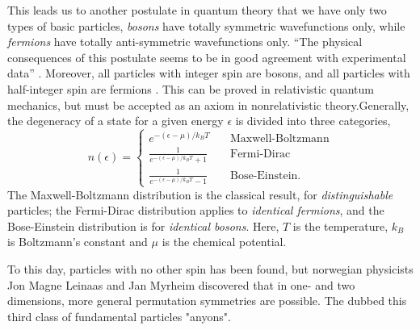         This leads us to another postulate in quantum theory that we have only two types of 
        basic particles, \emph{bosons} have totally symmetric wavefunctions only, while 
        \emph{fermions} have totally anti-symmetric wavefunctions only. ``The physical 
        consequences of this postulate seems to be in good agreement with experimental data''
        \cite{leinaas1977theory}. Moreover, all particles with integer spin are bosons, 
        and all particles with half-integer spin are fermions
        \cite{fierz1939relativistische,pauli1940connection}. This can be proved in relativistic
        quantum mechanics, but must be accepted as an axiom in nonrelativistic 
        theory\cite{hilborn1995atoms}.Generally, the degeneracy of a state for a given 
        energy $\epsilon$ is divided into three categories,
        \begin{equation}
            n(\epsilon) = \begin{cases}
                e^{-(\epsilon - \mu)/k_BT} &\quad \text{Maxwell-Boltzmann} \\
                \frac{1}{e^{-(\epsilon - \mu)/k_BT} + 1} &\quad \text{Fermi-Dirac} \\
                \frac{1}{e^{-(\epsilon - \mu)/k_BT} - 1} &\quad \text{Bose-Einstein}.
            \end{cases}
        \end{equation}
        The Maxwell-Boltzmann distribution is the classical result, for \emph{distinguishable}
        particles; the Fermi-Dirac distribution applies to \emph{identical fermions}, and 
        the Bose-Einstein distribution is for \emph{identical bosons}. Here, $T$ is the 
        temperature, $k_B$ is Boltzmann's constant and $\mu$ is the chemical potential.

        To this day, particles with no other spin has been found, but norwegian physicists
        Jon Magne Leinaas and Jan Myrheim discovered that in one- and two dimensions, more 
        general permutation symmetries are possible. The dubbed this third class of
        fundamental particles "anyons"\cite{leinaas1977theory}.
        